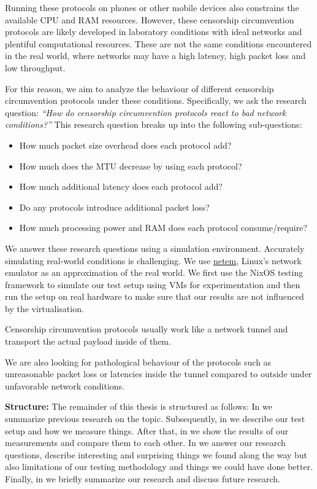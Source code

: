 Running these protocols on phones or other mobile devices also constrains the available CPU and RAM resources.
However, these censorship circumvention protocols are likely developed in laboratory conditions with ideal networks and plentiful computational resources.
These are not the same conditions encountered in the real world, where networks may have a high latency, high packet loss and low throughput.

For this reason, we aim to analyze the behaviour of different censorship circumvention protocols under these conditions.
Specifically, we ask the research question:
\emph{``How do censorship circumvention protocols react to bad network conditions?''}
This research question breaks up into the following sub-questions:
\begin{itemize}
  \item How much packet size overhead does each protocol add?
  \item How much does the MTU decrease by using each protocol?
  \item How much additional latency does each protocol add?
  \item Do any protocols introduce additional packet loss?
  \item How much processing power and RAM does each protocol consume/require?
\end{itemize}

We answer these research questions using a simulation environment.
Accurately simulating real-world conditions is challenging.
We use \href{https://man7.org/linux/man-pages/man8/tc-netem.8.html}{netem}, Linux's network emulator as an approximation of the real world.
We first use the NixOS testing framework to simulate our test setup using VMs for experimentation and then run the setup on real hardware to make sure that our results are not influenced by the virtualisation.

Censorship circumvention protocols usually work like a network tunnel and transport the actual payload inside of them.

We are also looking for pathological behaviour of the protocols such as unreasonable packet loss or latencies inside the tunnel compared to outside under unfavorable network conditions.

\noindent\textbf{Structure:}
The remainder of this thesis is structured as follows:
In  we summarize previous research on the topic.
Subsequently, in  we describe our test setup and how we measure things.
After that, in  we show the results of our measurements and compare them to each other.
In  we answer our research questions, describe interesting and surprising things we found along the way but also limitations of our testing methodology and things we could have done better.
Finally, in  we briefly summarize our research and discuss future research.
